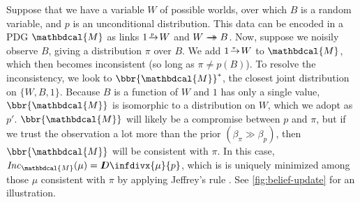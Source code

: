 \documentclass[letterpaper]{article} %
\theoremstyle{plain}
\theoremstyle{definition}
\theoremstyle{remark}
\newcommand{\thickD}{I\mkern-8muD}
\newcommand{\kldiv}{\thickD\infdivx}
\def\sheq{\!=\!}
\newcommand{\tto}{\rightarrow\mathrel{\mspace{-15mu}}\rightarrow}
\newcommand{\dg}[1]{\mathbdcal{#1}}
\newcommand\Inc{\mathit{Inc}}
\newcommand{\ed}[3]{#2\!%
  \overset{\smash{\mskip-5mu\raisebox{-1pt}{$\scriptscriptstyle
        #1$}}}{\rightarrow}\! #3}
\begin{document}
{{	%
	\begin{example}
		Suppose that we have a variable $W$ of possible worlds, over which $B$ is a random  variable, and $p$ is an unconditional distribution. This data can be encoded in a PDG $\dg M$ as links $\ed{p}{1}{W}$ and $W \tto B$.
		Now, suppose we noisily observe $B$, giving a distribution $\pi$ over $B$. We add $\ed\pi1W$ to $\dg M$, which then becomes inconsistent (so long as $\pi \neq p(B)$). To resolve the inconsistency, we look to $\bbr{\dg M}^*$, the closest joint distribution on $\{W, B, 1\}$. Because $B$ is a function of $W$ and $1$ has only a single value, $\bbr{\dg M}$ is isomorphic to a distribution on $W$, which we adopt as $p'$.  $\bbr{\dg M}$ will likely be a compromise between $p$ and $\pi$, but if we trust the observation a lot more than the prior $(\beta_\pi \gg \beta_p)$, then $\bbr{\dg M}$ will be consistent with $\pi$. In this case, $\Inc_{\dg M}(\mu) = \kldiv{\mu}{p}$, which is is uniquely minimized among those $\mu$ consistent with $\pi$ by applying Jeffrey's rule \cite{halpern2017reasoning}. See \cref{fig:belief-update} for an illustration.
	\end{example}


% 
	\begin{figure}[htb]
		\centering
%				
%				
\end{figure}}}
\end{document}
